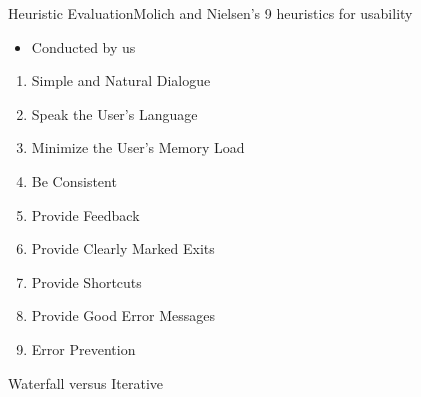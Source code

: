 \begin{frame}{Heuristic Evaluation}{Molich and Nielsen’s 9 heuristics for usability}
    \begin{itemize}
        \item Conducted by us
    \end{itemize}
    \begin{enumerate}
        \item Simple and Natural Dialogue
        \item Speak the User’s Language 
        \item Minimize the User’s Memory Load 
        \item Be Consistent
        \item Provide Feedback 
        \item Provide Clearly Marked Exits 
        \item Provide Shortcuts 
        \item Provide Good Error Messages
        \item Error Prevention
    \end{enumerate}
\end{frame}

\begin{frame}{Waterfall versus Iterative}
	    \centering {}
        \newline \centering {}
\end{frame}
